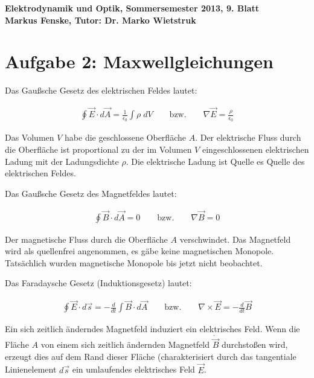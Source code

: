 \documentclass[a4paper,german,12pt,smallheadings]{scrartcl}
\begin{document}
\begin{center}
\bfseries %
\sffamily %
\vspace{-40pt}
Elektrodynamik und Optik, Sommersemester 2013, 9. Blatt \\
Markus Fenske, Tutor: Dr. Marko Wietstruk
\vspace{-10pt}
\end{center}
\section*{Aufgabe 2: Maxwellgleichungen}

Das Gaußsche Gesetz des elektrischen Feldes lautet:

\begin{align*}
  \oint \vec{E} \cdot d\vec{A} = \frac{1}{\epsilon_0} \int \rho\;dV \qquad\text{bzw.}\qquad \nabla \vec{E} = \frac{\rho}{\epsilon_0}
\end{align*}

Das Volumen $V$ habe die geschlossene Oberfläche $A$. Der elektrische Fluss
durch die Oberfläche ist proportional zu der im Volumen $V$ eingeschlossenen
elektrischen Ladung mit der Ladungsdichte $\rho$. Die elektrische Ladung ist
Quelle es Quelle des elektrischen Feldes.

Das Gaußsche Gesetz des Magnetfeldes lautet:

\begin{align*}
  \oint \vec{B} \cdot d\vec{A} = 0 \qquad\text{bzw.}\qquad \nabla \vec{B} = 0
\end{align*}

Der magnetische Fluss durch die Oberfläche $A$ verschwindet. Das Magnetfeld
wird als quellenfrei angenommen, es gäbe keine magnetischen Monopole.
Tatsächlich wurden magnetische Monopole bis jetzt nicht beobachtet.

Das Faradaysche Gesetz (Induktionsgesetz) lautet:

\begin{align*}
  \oint \vec{E} \cdot d\vec{s} = -\frac{d}{dt} \int \vec{B} \cdot d\vec{A} \qquad\text{bzw.}\qquad \nabla \times \vec{E} = -\frac{d}{dt} \vec{B}
\end{align*}

Ein sich zeitlich änderndes Magnetfeld induziert ein elektrisches Feld. Wenn
die Fläche $A$ von einem sich zeitlich ändernden Magnetfeld $\dot{\vec{B}}$
durchstoßen wird, erzeugt dies auf dem Rand dieser Fläche (charakterisiert
durch das tangentiale Linienelement $d\vec{s}$ ein umlaufendes elektrisches
Feld $\vec{E}$.
\end{document}
